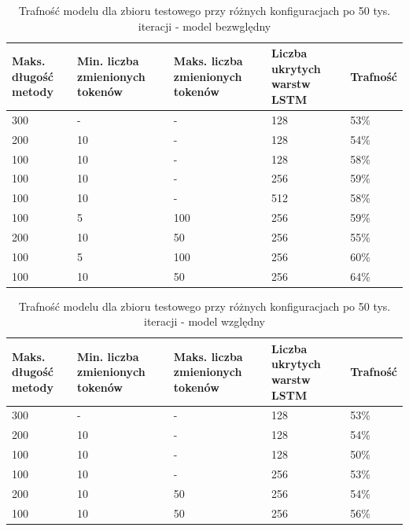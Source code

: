 \documentclass[12pt]{report}
\begin{document}
\begin{table}[t]
\caption{Trafność modelu dla zbioru testowego przy różnych konfiguracjach po 50 tys. iteracji - model bezwględny}
\label{tbl:learn:results-map-bz}
\begin{tabular}{|p{}|p{}|p{}|p{}|p{}|}
  \hline 
  \textbf{Maks. długość metody} & \textbf{Min. liczba zmienionych tokenów} & \textbf{Maks. liczba zmienionych tokenów} & \textbf{Liczba ukrytych warstw LSTM} & \textbf{Trafność} \\ \hline 
  300 & - & - & 128 & 53\% \\ \hline 
  200 & 10 & - & 128 & 54\% \\ \hline
  100 & 10 & - & 128 & 58\% \\ \hline
  100 & 10 & - & 256 & 59\% \\ \hline
  100 & 10 & - & 512 & 58\% \\ \hline
  100 & 5 & 100 & 256 & 59\% \\ \hline
  200 & 10 & 50 & 256 & 55\% \\ \hline
  100 & 5 & 100 & 256 & 60\% \\ \hline
  100 & 10 & 50 & 256 & 64\% \\ \hline
\end{tabular} 
\end{table}


\begin{table}[t]
\caption{Trafność modelu dla zbioru testowego przy różnych konfiguracjach po 50 tys. iteracji - model względny}
\label{tbl:learn:results-map-wz}
\begin{tabular}{|p{}|p{}|p{}|p{}|p{}|}
  \hline 
  \textbf{Maks. długość metody} & \textbf{Min. liczba zmienionych tokenów} & \textbf{Maks. liczba zmienionych tokenów} & \textbf{Liczba ukrytych warstw LSTM} & \textbf{Trafność} \\ \hline 
  300 & - & - & 128 & 53\% \\ \hline 
  200 & 10 & - & 128 & 54\% \\ \hline
  100 & 10 & - & 128 & 50\% \\ \hline
  100 & 10 & - & 256 & 53\% \\ \hline
  200 & 10 & 50 & 256 & 54\% \\ \hline
  100 & 10 & 50 & 256 & 56\% \\ \hline
\end{tabular} 
\end{table}
\end{document}
